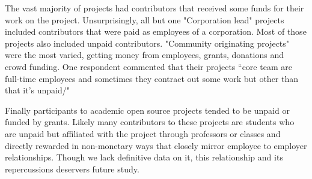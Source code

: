 The vast majority of projects had contributors that received some funds for their work on the project. Unsurprisingly, all but one "Corporation lead" projects included contributors that were paid as employees of a corporation. Most of those projects also included unpaid contributors. "Community originating projects" were the most varied, getting money from employees, grants, donations and crowd funding. One respondent commented that their projects “core team are full-time employees and sometimes they contract out some work but other than that it's unpaid/"

Finally participants to academic open source projects tended to be unpaid or funded by grants. Likely many contributors to these projects are students who are unpaid but affiliated with the project through professors or classes and directly rewarded in non-monetary ways that closely mirror employee to employer relationships. Though we lack definitive data on it, this relationship and its repercussions deservers future study.
